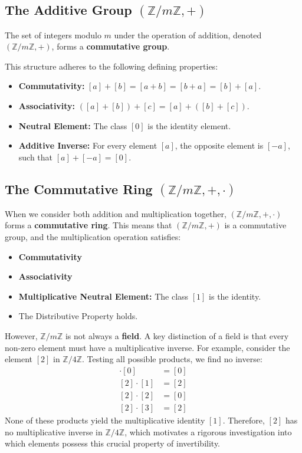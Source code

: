 \subsection{The Additive Group $(\mathbb{Z}/m\mathbb{Z}, +)$}
\begin{proposition}
The set of integers modulo $m$ under the operation of addition, denoted $(\mathbb{Z}/m\mathbb{Z}, +)$, forms a \textbf{commutative group}.
\end{proposition}
This structure adheres to the following defining properties:
\begin{itemize}
    \item \textbf{Commutativity:} $[a] + [b] = [a+b] = [b+a] = [b] + [a]$.
    \item \textbf{Associativity:} $([a] + [b]) + [c] = [a] + ([b] + [c])$.
    \item \textbf{Neutral Element:} The class $[0]$ is the identity element.
    \item \textbf{Additive Inverse:} For every element $[a]$, the opposite element is $[-a]$, such that $[a] + [-a] = [0]$.
\end{itemize}

\subsection{The Commutative Ring $(\mathbb{Z}/m\mathbb{Z}, +, \cdot)$}
When we consider both addition and multiplication together, $(\mathbb{Z}/m\mathbb{Z}, +, \cdot)$ forms a \textbf{commutative ring}. This means that $(\mathbb{Z}/m\mathbb{Z}, +)$ is a commutative group, and the multiplication operation satisfies:
\begin{itemize}
    \item \textbf{Commutativity}
    \item \textbf{Associativity}
    \item \textbf{Multiplicative Neutral Element:} The class $[1]$ is the identity.
    \item The Distributive Property holds.
\end{itemize}
However, $\mathbb{Z}/m\mathbb{Z}$ is not always a \textbf{field}. A key distinction of a field is that every non-zero element must have a multiplicative inverse. For example, consider the element $[2]$ in $\mathbb{Z}/4\mathbb{Z}$. Testing all possible products, we find no inverse:
\begin{align*}
[2] \cdot [0] &= [0] \\
[2] \cdot [1] &= [2] \\
[2] \cdot [2] &= [0] \\
[2] \cdot [3] &= [2]
\end{align*}
None of these products yield the multiplicative identity $[1]$. Therefore, $[2]$ has no multiplicative inverse in $\mathbb{Z}/4\mathbb{Z}$, which motivates a rigorous investigation into which elements possess this crucial property of invertibility.

